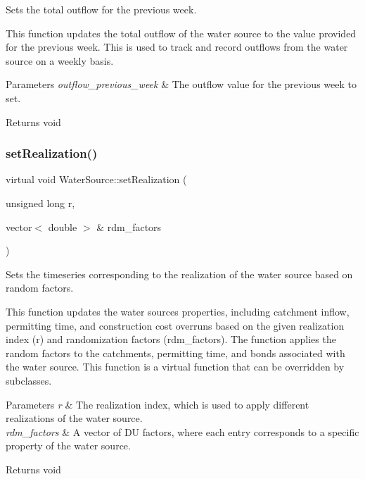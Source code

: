 Sets the total outflow for the previous week. 

This function updates the total outflow of the water source to the value provided for the previous week. This is used to track and record outflows from the water source on a weekly basis.


\begin{DoxyParams}{Parameters}
{\em outflow\+\_\+previous\+\_\+week} & The outflow value for the previous week to set.\\
\hline
\end{DoxyParams}
\begin{DoxyReturn}{Returns}
void 
\end{DoxyReturn}
\mbox{\label{classWaterSource_a634904c510b16de6d7c057fed6d6e625}} 
\subsubsection{\texorpdfstring{set\+Realization()}{setRealization()}}
{\footnotesize\ttfamily virtual void Water\+Source\+::set\+Realization (\begin{DoxyParamCaption}\item[{unsigned long}]{r,  }\item[{vector$<$ double $>$ \&}]{rdm\+\_\+factors }\end{DoxyParamCaption})\hspace{0.3cm}{\ttfamily [virtual]}}



Sets the timeseries corresponding to the realization of the water source based on random factors. 

This function updates the water source\textquotesingle{}s properties, including catchment inflow, permitting time, and construction cost overruns based on the given realization index ({\ttfamily r}) and randomization factors ({\ttfamily rdm\+\_\+factors}). The function applies the random factors to the catchments, permitting time, and bonds associated with the water source. This function is a virtual function that can be overridden by subclasses.


\begin{DoxyParams}{Parameters}
{\em r} & The realization index, which is used to apply different realizations of the water source. \\
\hline
{\em rdm\+\_\+factors} & A vector of DU factors, where each entry corresponds to a specific property of the water source.\\
\hline
\end{DoxyParams}
\begin{DoxyReturn}{Returns}
void 
\end{DoxyReturn}


